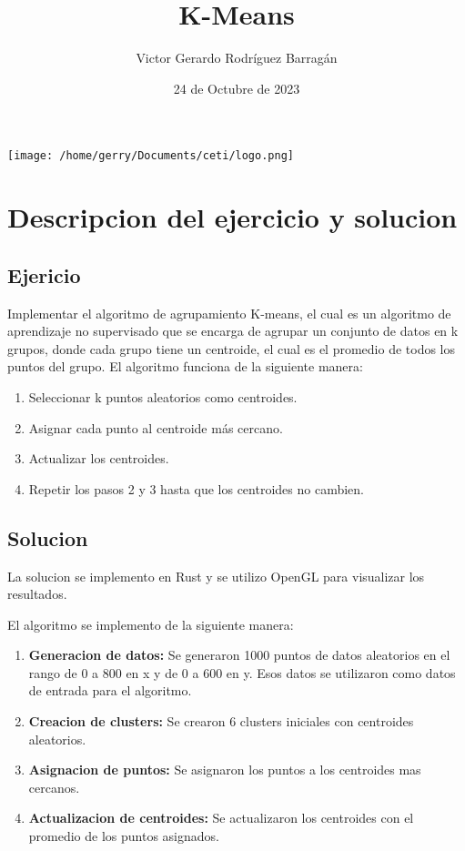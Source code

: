 \documentclass{article}
\title{K-Means}
\author{Victor Gerardo Rodríguez Barragán}
\date{24 de Octubre de 2023}
\begin{document}
\maketitle
\begin{center}
    \texttt{[image: /home/gerry/Documents/ceti/logo.png]}
\end{center}

\newpage
\justify
\section{Descripcion del ejercicio y solucion}
\subsection{Ejericio}
Implementar el algoritmo de agrupamiento K-means, el cual es un algoritmo de aprendizaje no supervisado
que se encarga de agrupar un conjunto de datos en k grupos, donde cada grupo tiene un centroide,
el cual es el promedio de todos los puntos del grupo. El algoritmo funciona de la siguiente manera:
\begin{enumerate}
    \item Seleccionar k puntos aleatorios como centroides.
    \item Asignar cada punto al centroide más cercano.
    \item Actualizar los centroides.
    \item Repetir los pasos 2 y 3 hasta que los centroides no cambien.
\end{enumerate}
\subsection{Solucion}
La solucion se implemento en Rust y se utilizo OpenGL para visualizar los resultados.

El algoritmo se implemento de la siguiente manera:
\begin{enumerate}
    \item \textbf{Generacion de datos:} Se generaron 1000 puntos de datos aleatorios en el rango de 0 a 800 en x y de 0 a 600 en y. Esos
        datos se utilizaron como datos de entrada para el algoritmo.
    \item \textbf{Creacion de clusters:} Se crearon 6 clusters iniciales con centroides aleatorios.
    \item \textbf{Asignacion de puntos:} Se asignaron los puntos a los centroides mas cercanos.
    \item \textbf{Actualizacion de centroides:} Se actualizaron los centroides con el promedio de los puntos asignados.
\end{enumerate}
\end{document}
